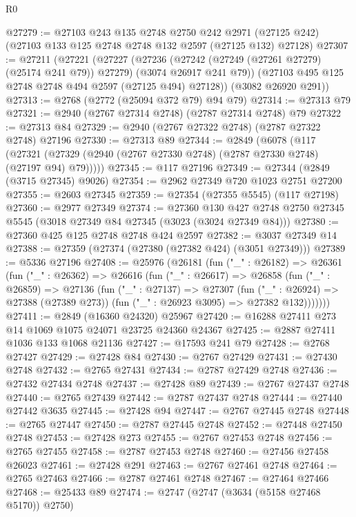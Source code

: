 \begin{lexlean}{R0}
\begin{coremodule}
@27279 := @27103
    @243
    @135
    @2748
    @2750
    @242
    @2971
    (@27125 @242)
    (@27103 @133 @125 @2748 @2748 @132 @2597 (@27125 @132) @27128)
@27307 := @27211
    (@27221
      (@27227
        (@27236 (@27242 (@27249 (@27261 @27279) (@25174 @241 @79)) @27279) (@3074 @26917 @241 @79))
        (@27103 @495 @125 @2748 @2748 @494 @2597 (@27125 @494) @27128))
      (@3082 @26920 @291))
@27313 := @2768 (@2772 (@25094 @372 @79) @94 @79)
@27314 := @27313 @79
@27321 := @2940 (@2767 @27314 @2748) (@2787 @27314 @2748) @79
@27322 := @27313 @84
@27329 := @2940 (@2767 @27322 @2748) (@2787 @27322 @2748) @27196
@27330 := @27313 @89
@27344 := @2849
    (@6078
      (@117 (@27321 (@27329 (@2940 (@2767 @27330 @2748) (@2787 @27330 @2748) (@27197 @94) @79)))))
@27345 := @117 @27196
@27349 := @27344 (@2849 (@3715 @27345) @9026)
@27354 := @2962 @27349 @720 @1023 @2751 @27200
@27355 := @2603 @27345
@27359 := @27354 (@27355 @5545) (@117 @27198)
@27360 := @2977 @27349
@27374 := @27360
    @130
    @427
    @2748
    @2750
    @27345
    @5545
    (@3018 @27349 @84 @27345 (@3023 (@3024 @27349 @84)))
@27380 := @27360 @425 @125 @2748 @2748 @424 @2597
@27382 := @3037 @27349 @14
@27388 := @27359 (@27374 (@27380 (@27382 @424) (@3051 @27349)))
@27389 := @5336 @27196
@27408 := @25976
    (@26181
      (fun ("_" : @26182) =>
      @26361
        (fun ("_" : @26362) =>
        @26616
          (fun ("_" : @26617) =>
          @26858
            (fun ("_" : @26859) =>
            @27136
              (fun ("_" : @27137) =>
              @27307
                (fun ("_" : @26924) => @27388 (@27389 @273))
                (fun ("_" : @26923 @3095) => @27382 @132)))))))
@27411 := @2849 (@16360 @24320) @25967
@27420 := @16288 @27411 @273 @14 @1069 @1075 @24071 @23725 @24360 @24367
@27425 := @2887 @27411 @1036 @133 @1068 @21136
@27427 := @17593 @241 @79
@27428 := @2768 @27427
@27429 := @27428 @84
@27430 := @2767 @27429
@27431 := @27430 @2748
@27432 := @2765 @27431
@27434 := @2787 @27429 @2748
@27436 := @27432 @27434 @2748
@27437 := @27428 @89
@27439 := @2767 @27437 @2748
@27440 := @2765 @27439
@27442 := @2787 @27437 @2748
@27444 := @27440 @27442 @3635
@27445 := @27428 @94
@27447 := @2767 @27445 @2748
@27448 := @2765 @27447
@27450 := @2787 @27445 @2748
@27452 := @27448 @27450 @2748
@27453 := @27428 @273
@27455 := @2767 @27453 @2748
@27456 := @2765 @27455
@27458 := @2787 @27453 @2748
@27460 := @27456 @27458 @26023
@27461 := @27428 @291
@27463 := @2767 @27461 @2748
@27464 := @2765 @27463
@27466 := @2787 @27461 @2748
@27467 := @27464 @27466
@27468 := @25433 @89
@27474 := @2747 (@2747 (@3634 (@5158 @27468 @5170)) @2750)

\end{coremodule}
\end{lexlean}
